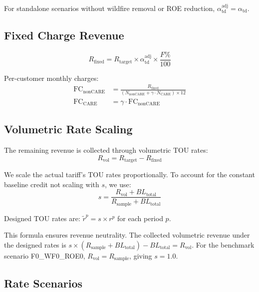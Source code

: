 \documentclass[11pt]{article}
\begin{document}
For standalone scenarios without wildfire removal or ROE reduction, $\alpha_{\text{td}}^{\text{adj}} = \alpha_{\text{td}}$.

\subsection{Fixed Charge Revenue}

\begin{equation}
R_{\text{fixed}} = R_{\text{target}} \times \alpha_{\text{td}}^{\text{adj}} \times \frac{F\%}{100}
\end{equation}

Per-customer monthly charges:
\begin{align}
\text{FC}_{\text{nonCARE}} &= \frac{R_{\text{fixed}}}{(N_{\text{nonCARE}} + \gamma \cdot N_{\text{CARE}}) \times 12} \\
\text{FC}_{\text{CARE}} &= \gamma \cdot \text{FC}_{\text{nonCARE}}
\end{align}

\subsection{Volumetric Rate Scaling}

The remaining revenue is collected through volumetric TOU rates:
\begin{equation}
R_{\text{vol}} = R_{\text{target}} - R_{\text{fixed}}
\end{equation}

We scale the actual tariff's TOU rates proportionally. To account for the constant baseline credit not scaling with $s$, we use:
\begin{equation}
\boxed{s = \frac{R_{\text{vol}} + BL_{\text{total}}}{R_{\text{sample}} + BL_{\text{total}}}}
\end{equation}

Designed TOU rates are: $\tilde{r}^p = s \times r^p$ for each period $p$.

This formula ensures revenue neutrality. The collected volumetric revenue under the designed rates is $s \times (R_{\text{sample}} + BL_{\text{total}}) - BL_{\text{total}} = R_{\text{vol}}$. For the benchmark scenario F0\_WF0\_ROE0, $R_{\text{vol}} = R_{\text{sample}}$, giving $s = 1.0$.

\subsection{Rate Scenarios}
\end{document}
